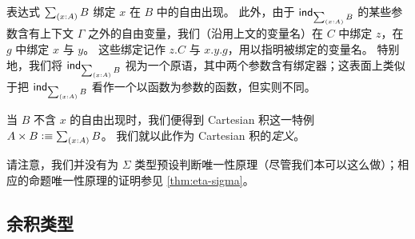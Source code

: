 
%
表达式 $\tsm{x:A} B$ 绑定 $x$ 在 $B$ 中的自由出现。
此外，由于 $\ind{\tsm{x:A} B}$ 的某些参数含有上下文 $\Gamma$ 之外的自由变量，我们（沿用上文的变量名）在 $C$ 中绑定 $z$，在 $g$ 中绑定 $x$ 与 $y$。
这些绑定记作 $z.C$ 与 $x.y.g$，用以指明被绑定的变量名。
%
特别地，我们将 $\ind{\tsm{x:A} B}$ 视为一个原语，其中两个参数含有绑定器；这表面上类似于把 $\ind{\tsm{x:A} B}$ 看作一个以函数为参数的函数，但实则不同。

当 $B$ 不含 $x$ 的自由出现时，我们便得到 Cartesian 积这一特例 $A \times B \defeq \tsm{x:A} B$。
我们就以此作为 Cartesian 积的\emph{定义}。

请注意，我们并没有为 $\Sigma$ 类型预设判断唯一性原理（尽管我们本可以这么做）；相应的命题唯一性原理的证明参见 \cref{thm:eta-sigma}。

\subsection{余积类型}

%

